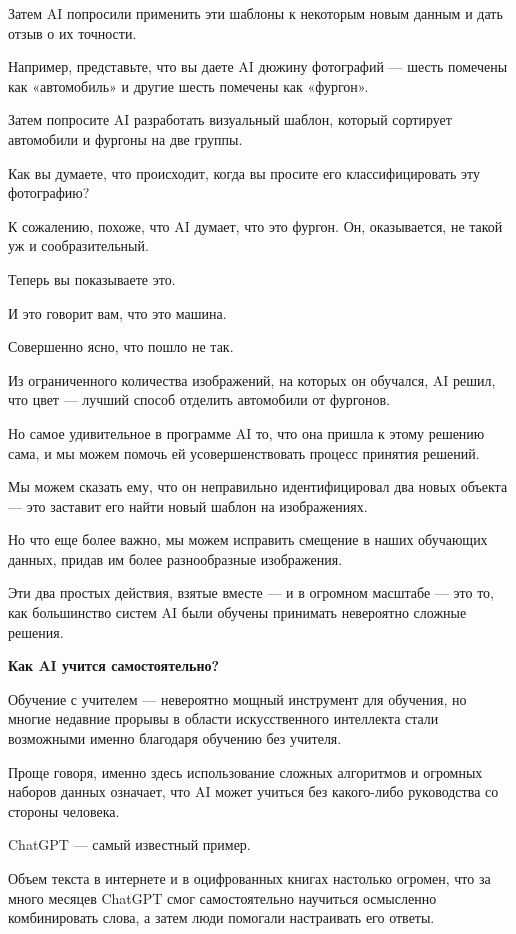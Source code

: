 Затем AI попросили применить эти шаблоны к некоторым новым данным и дать отзыв о их точности.

Например, представьте, что вы даете AI дюжину фотографий — шесть помечены как «автомобиль» и другие шесть помечены как «фургон».



Затем попросите AI разработать визуальный шаблон, который сортирует автомобили и фургоны на две группы.

Как вы думаете, что происходит, когда вы просите его классифицировать эту фотографию?



К сожалению, похоже, что AI думает, что это фургон. Он, оказывается, не такой уж и сообразительный.

Теперь вы показываете это.



И это говорит вам, что это машина.

Совершенно ясно, что пошло не так.

Из ограниченного количества изображений, на которых он обучался, AI решил, что цвет — лучший способ отделить автомобили от фургонов.

Но самое удивительное в программе AI то, что она пришла к этому решению сама, и мы можем помочь ей усовершенствовать процесс принятия решений.

Мы можем сказать ему, что он неправильно идентифицировал два новых объекта — это заставит его найти новый шаблон на изображениях.

Но что еще более важно, мы можем исправить смещение в наших обучающих данных, придав им более разнообразные изображения.

Эти два простых действия, взятые вместе — и в огромном масштабе — это то, как большинство систем AI были обучены принимать невероятно сложные решения.

\textbf{Как AI учится самостоятельно?}

Обучение с учителем — невероятно мощный инструмент для обучения, но многие недавние прорывы в области искусственного интеллекта стали возможными именно благодаря обучению без учителя.

Проще говоря, именно здесь использование сложных алгоритмов и огромных наборов данных означает, что AI может учиться без какого-либо руководства со стороны человека.

ChatGPT — самый известный пример.

Объем текста в интернете и в оцифрованных книгах настолько огромен, что за много месяцев ChatGPT смог самостоятельно научиться осмысленно комбинировать слова, а затем люди помогали настраивать его ответы.

